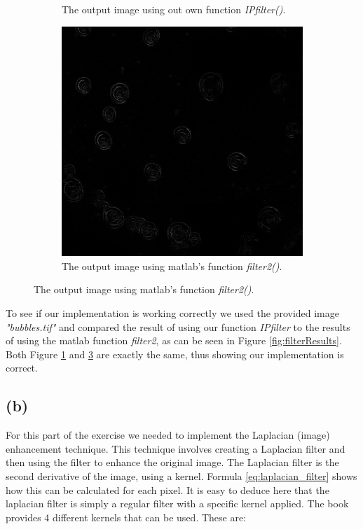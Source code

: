 \documentclass{article}
\begin{document}
\begin{figure}[H]
\begin{subfigure}[t]{0.32\textwidth}
        \caption{The output image using out own function \textit{IPfilter()}.}
        \label{fig:filterKevin}
    \end{subfigure}
    \hfill
    \begin{subfigure}[t]{0.32\textwidth}
        \centering
        \includegraphics[width=\textwidth]{Assignment_1/output_images/filter_matlab.png}
        \caption{The output image using matlab's function \textit{filter2()}.}
        \label{fig:filterMatlab}
    \end{subfigure}
\end{figure}

To see if our implementation is working correctly we used the provided image \textit{"bubbles.tif"} and compared the result of using our function \textit{IPfilter} to the results of using the matlab function \textit{filter2}, as can be seen in Figure \ref{fig:filterResults}. Both Figure \ref{fig:filterKevin} and \ref{fig:filterMatlab} are exactly the same, thus showing our implementation is correct.

\subsection*{(b)}
For this part of the exercise we needed to implement the Laplacian (image) enhancement technique. This technique involves creating a Laplacian filter and then using the filter to enhance the original image. The Laplacian filter is the second derivative of the image, using a kernel. Formula \ref{eq:laplacian_filter} shows how this can be calculated for each pixel. It is easy to deduce here that the laplacian filter is simply a regular filter with a specific kernel applied. The book provides 4 different kernels that can be used. These are: 
\end{document}

